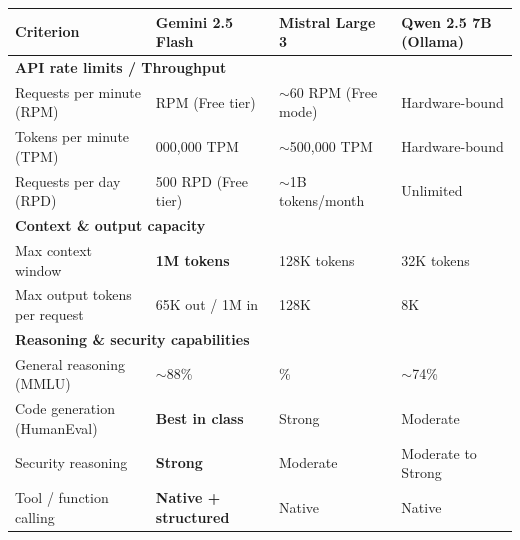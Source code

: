 \documentclass[12pt,a4paper]{report}
\begin{document}
\begin{table}[H]
    \centering
    \renewcommand{\arraystretch}{1.45}
    \begin{tabular}{|p{}|
                    >{\centering\arraybackslash}p{}|
                    >{\centering\arraybackslash}p{}|
                    >{\centering\arraybackslash}p{}|}
        \hline
        \textbf{Criterion} & \textbf{Gemini 2.5 Flash} &
        \textbf{Mistral Large 3} & \textbf{Qwen 2.5 7B (Ollama)} \\
        \hline
        \multicolumn{4}{|l|}{\textbf{API rate limits / Throughput}} \\
        \hline
        Requests per minute (RPM) &
        15 RPM (Free tier) &
        $\sim$60 RPM (Free mode) &
        Hardware-bound \\
        \hline
        Tokens per minute (TPM) &
        1{,}000{,}000 TPM &
        $\sim$500{,}000 TPM &
        Hardware-bound \\
        \hline
        Requests per day (RPD) &
        1{,}500 RPD (Free tier) &
        $\sim$1B tokens/month &
        Unlimited \\
        \hline
        \multicolumn{4}{|l|}{\textbf{Context \& output capacity}} \\
        \hline
        Max context window &
        \textbf{1M tokens} & 128K tokens & 32K tokens \\
        \hline
        Max output tokens per request &
        65K out / 1M in & 128K & 8K \\
        \hline
        \multicolumn{4}{|l|}{\textbf{Reasoning \& security capabilities}} \\
        \hline
        General reasoning (MMLU) &
        $\sim$88\%~\cite{llmstatsFlash} &
        84\%~\cite{mistralDocs} &
        $\sim$74\%~\cite{qwen25report} \\
        \hline
        Code generation (HumanEval) &
        \textbf{Best in class}~\cite{llmstatsFlash} &
        Strong~\cite{mistralDocs} &
        Moderate~\cite{qwen25report} \\
        \hline
        Security reasoning &
        \textbf{Strong}~\cite{llmstatsFlash} &
        Moderate~\cite{mistralDocs} &
        Moderate to Strong~\cite{qwen25report} \\
        \hline
        Tool / function calling &
        \textbf{Native + structured}~\cite{llmstatsFlash} &
        Native~\cite{mistralDocs} &
        Native~\cite{qwen25report} \\

\end{tabular}
\end{table}
\end{document}
